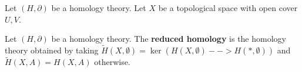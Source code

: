 \begin{example}
\end{example}

\begin{proposition}
	Let $(H,\partial)$ be a homology theory. Let $X$ be a topological space with open cover $U,V$. 
\end{proposition}

\begin{definition}
	Let $(H,\partial)$ be a homology theory. The \textbf{reduced homology} is the homology theory obtained by taking $\tilde{H}(X,\emptyset) = \ker(H(X,\emptyset) --> H(*,\emptyset))$ and $\tilde{H}(X,A) = H(X,A)$ otherwise.
\end{definition}










